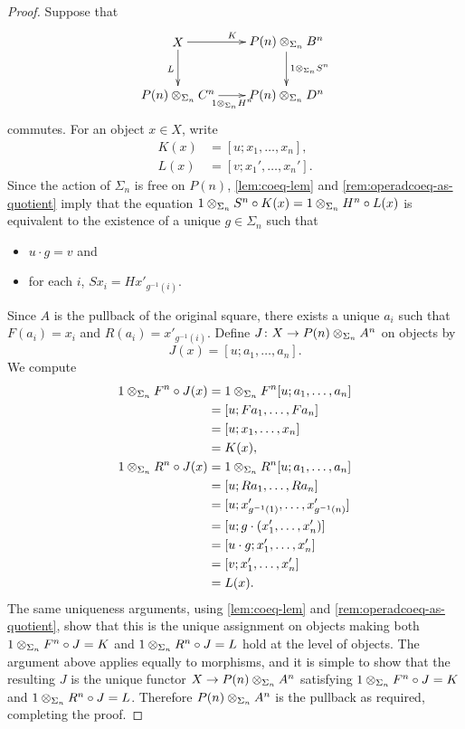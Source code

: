 \begin{proof}
Suppose that 
        \[
            \xy
                (0,0)*+{X}="00";
                (30,0)*+{\coeqsig{P}{B}{n}}="10";
                (0,-15)*+{\coeqsig{P}{C}{n}}="01";
                (30,-15)*+{\coeqsig{P}{D}{n}}="11";
                {\ar^{K} "00" ; "10"};
                {\ar^{\coeqb{1}{S^n}{\Sigma_{n}}} "10" ; "11"};
                {\ar_{L} "00" ; "01"};
                {\ar_{\coeqb{1}{H^n}{\Sigma_{n}}} "01" ; "11"}:
            \endxy
    \]
commutes. For an object $x \in X$, write 
\begin{align*}
K(x) & = [u; x_1, \ldots, x_n],\\
L(x) & = [v; x_1', \ldots, x_n'].
\end{align*}
Since the action of $\Sigma_n$ is free on $P(n)$, \cref{lem:coeq-lem} and \cref{rem:operadcoeq-as-quotient} imply that the equation $\coeqb{1}{S^n}{\Sigma_{n}}\circ K(x) = \coeqb{1}{H^n}{\Sigma_{n}}\circ L(x)$ is equivalent to the existence of a unique $g \in \Sigma_n$ such that
\begin{itemize}
\item $u \cdot g = v$ and
\item for each $i$, $Sx_i = Hx'_{g^{-1}(i)}$.
\end{itemize}
Since $A$ is the pullback of the original square, there exists a unique $a_i$ such that $F(a_i) = x_i$ and $R(a_i) = x'_{g^{-1}(i)}$. Define $J \colon X \to \coeqsig{P}{A}{n}$ on objects by 
\[
J(x) = [u; a_1, \ldots, a_n].
\]
We compute
\begin{align*}
\coeqb{1}{F^n}{\Sigma_{n}}\circ J(x) & = \coeqb{1}{F^n}{\Sigma_{n}}[u; a_1, \ldots, a_n] \\
& = [u; Fa_1, \ldots, Fa_n] \\
& = [u; x_1, \ldots, x_n]\\
& = K(x), \\
\coeqb{1}{R^n}{\Sigma_{n}}\circ J(x) & = \coeqb{1}{R^n}{\Sigma_{n}}[u; a_1, \ldots, a_n] \\
& = [u; Ra_1, \ldots, Ra_n] \\
& = [u; x'_{g^{-1}(1)}, \ldots, x'_{g^{-1}(n)}]\\
& = [u; g \cdot(x'_1, \ldots, x'_n)] \\
& = [u \cdot g; x'_1, \ldots, x'_n] \\
& = [v; x'_1, \ldots, x'_n] \\
& = L(x).
\end{align*}
The same uniqueness arguments, using \cref{lem:coeq-lem} and \cref{rem:operadcoeq-as-quotient}, show that this is the unique assignment on objects making both $\coeqb{1}{F^n}{\Sigma_{n}}\circ J = K$ and $\coeqb{1}{R^n}{\Sigma_{n}}\circ J = L$ hold at the level of objects. The argument above applies equally to morphisms, and it is simple to show that the resulting $J$ is the unique functor $X \to \coeqsig{P}{A}{n}$ satisfying $\coeqb{1}{F^n}{\Sigma_{n}}\circ J = K$ and $\coeqb{1}{R^n}{\Sigma_{n}}\circ J = L$. Therefore $\coeqsig{P}{A}{n}$ is the pullback as required, completing the proof.
\end{proof}

